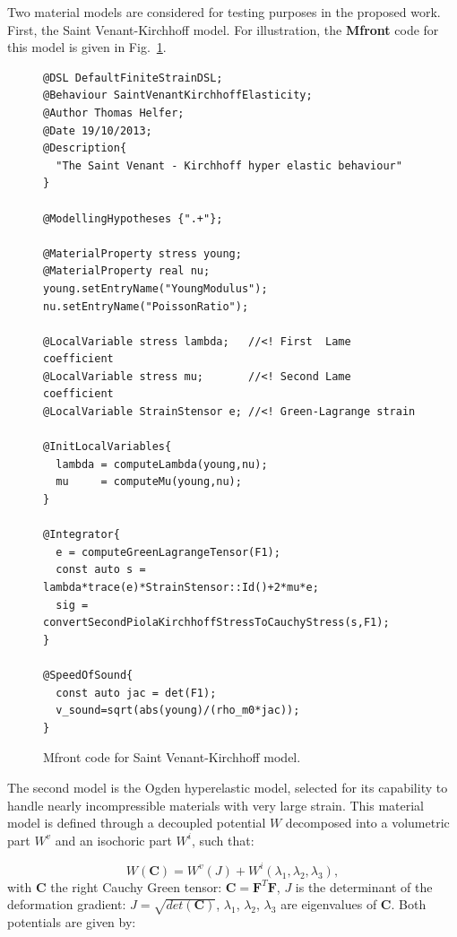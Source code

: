 Two material models are considered for testing purposes in the proposed work. First, the Saint Venant-Kirchhoff model. For illustration, the \textbf{Mfront} code for this model is given in Fig.~\ref{fig-code-mfront}. 
\begin{figure}[h]
\begin{lstlisting}
@DSL DefaultFiniteStrainDSL;
@Behaviour SaintVenantKirchhoffElasticity;
@Author Thomas Helfer;
@Date 19/10/2013;
@Description{
  "The Saint Venant - Kirchhoff hyper elastic behaviour"
}

@ModellingHypotheses {".+"};

@MaterialProperty stress young;
@MaterialProperty real nu;
young.setEntryName("YoungModulus");
nu.setEntryName("PoissonRatio");

@LocalVariable stress lambda;   //<! First  Lame coefficient
@LocalVariable stress mu;       //<! Second Lame coefficient
@LocalVariable StrainStensor e; //<! Green-Lagrange strain

@InitLocalVariables{
  lambda = computeLambda(young,nu);
  mu     = computeMu(young,nu);
}

@Integrator{
  e = computeGreenLagrangeTensor(F1);
  const auto s = lambda*trace(e)*StrainStensor::Id()+2*mu*e;
  sig = convertSecondPiolaKirchhoffStressToCauchyStress(s,F1);
}

@SpeedOfSound{
  const auto jac = det(F1);
  v_sound=sqrt(abs(young)/(rho_m0*jac));
}
\end{lstlisting}
\caption{Mfront code for Saint Venant-Kirchhoff model.}
\label{fig-code-mfront}
\end{figure}

The second model is the Ogden hyperelastic model, selected for its capability to handle nearly incompressible materials with very large strain. This material model is defined through a decoupled potential $W$ decomposed into a volumetric part $W^v$ and an isochoric part $W^i$, such that:

\begin{equation}
    W(\mathbf{C}) = W^v(J) + W^i ( \lambda_1, \lambda_2, \lambda_3),
\end{equation}
with $\mathbf{C}$ the right Cauchy Green tensor: $\mathbf{C}=\mathbf{F}^T\mathbf{F}$, $J$ is the determinant of the deformation gradient: $J=\sqrt{det(\mathbf{C})}$, $\lambda_1$, $\lambda_2$, $\lambda_3$ are eigenvalues of $\mathbf{C}$. Both potentials are given by: 

